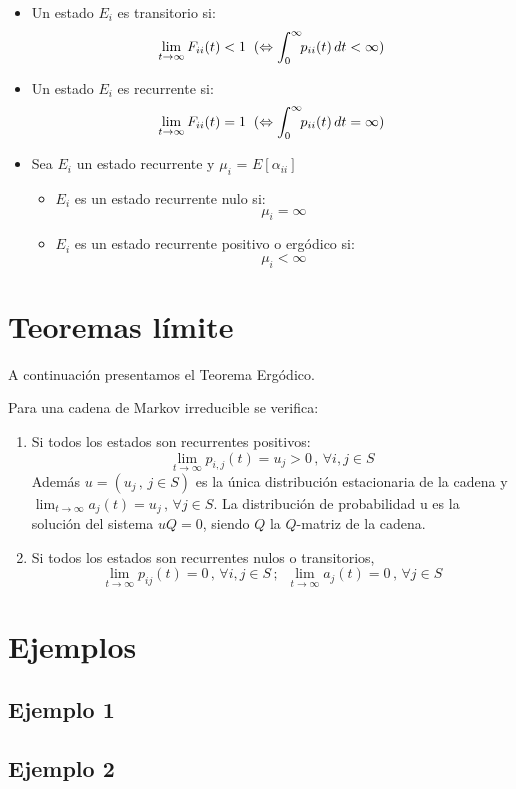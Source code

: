 \documentclass[12pt,a4paper]{article}
\begin{document}
   \begin{itemize}
   	\item Un estado $E_{i}$ es transitorio si:
   	\begin{equation*}
   	\lim\limits_{t\rightarrow \infty}F_{ii}(t)<1
   	\\
   	\hspace{0.2cm} (\Leftrightarrow \int_0^\infty\!\!p_{ii}(t)\,dt<\infty)
   	\end{equation*}
   	\item  Un estado $E_{i}$ es recurrente si:
   	\begin{equation*}
   		\lim\limits_{t\rightarrow \infty}F_{ii}(t)=1
   		\\
   		\hspace{0.2cm} (\Leftrightarrow \int_0^\infty\!\!p_{ii}(t)\,dt=\infty)
   	\end{equation*}
   	\item Sea $E_{i}$ un estado recurrente y $\mu_{i}$ = $E[\alpha_{ii}]$
   	\\
   	   	\begin{itemize}
   		\item $E_{i}$ es un estado recurrente nulo si:
   		\begin{equation*}
   		\mu_{i}= \infty
   		\end{equation*}
   		\item $E_{i}$ es un estado recurrente positivo o ergódico si:
   		\begin{equation*}
   		\mu_{i}< \infty
   		\end{equation*}
   	\end{itemize}
   \end{itemize}
\section{Teoremas límite}
A continuación presentamos el Teorema Ergódico.
\begin{theorem}
Para una cadena de Markov irreducible se verifica:
\begin{enumerate}
\item Si todos los estados son recurrentes positivos:
$$\lim_{t\rightarrow\infty}p_{i,j}(t)=u_j>0 \, , \, \forall i,j\in S$$
Además $u=(u_j \, , \, j\in S)$ es la única distribución estacionaria de la cadena y $\displaystyle\lim_{t\rightarrow\infty}a_j (t)=u_j \, , \, \forall j\in S$. La distribución de probabilidad u es la solución del sistema $uQ=0$, siendo $Q$ la $Q$-matriz de la cadena.
\item Si todos los estados son recurrentes nulos o transitorios,
$$\lim_{t\rightarrow\infty}p_{ij}(t)=0\, , \, \forall i,j \in S\, ;\,\,\, \lim_{t\rightarrow\infty}a_j (t)=0\, , \, \forall j\in S$$
\end{enumerate}
\end{theorem}
\section{Ejemplos}
\subsection{Ejemplo 1}
\subsection{Ejemplo 2}
\end{document}
